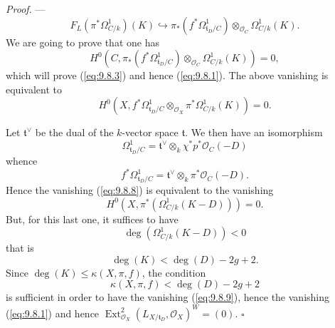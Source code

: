 \documentclass[12pt,a4paper,oneside,english,leqno]{smfart}
\numberwithin{equation}{subsection}
\numberwithin{theo}{subsection}
\theoremstyle{plain}
\theoremstyle{definition}
\theoremstyle{remark}
\newenvironment{preuve}[1][]{\medskip\noindent\textit{Proof.} #1 ---\ }%
  {\hfill\ensuremath{\square}\medskip}
\DeclareMathOperator{\Ext}{Ext}
\newcommand{\oc}{\mathcal{O}}
\newcommand{\tgo}{\mathfrak{t}}
\renewcommand{\leq}{\leqslant}
\begin{document}
\begin{preuve}
\begin{equation}\label{eq:9.8.6}
F_L(\pi^*\Omega^1_{C/k})(K)\hookrightarrow\pi_*(f^*\Omega^1_{\tgo_D/C})\otimes_{\oc_C}\Omega^1_{C/k}(K).
\end{equation}
We are going to prove that one has
\begin{equation}\label{eq:9.8.7}
H^0(C,\pi_*(f^*\Omega^1_{\tgo_D/C})\otimes_{\oc_C}\Omega^1_{C/k}(K))=0,
\end{equation}
which will prove (\ref{eq:9.8.3}) and hence (\ref{eq:9.8.1}). The above vanishing is equivalent to
\begin{equation}\label{eq:9.8.8}
H^0(X,f^*\Omega^1_{\tgo_D/C}\otimes_{\oc_X}\pi^*\Omega^1_{C/k}(K))=0.
\end{equation}

Let $\tgo^\vee$ be the dual of the $k$-vector space $\tgo$. We then have an isomorphism
\[
\Omega^1_{\tgo_D/C}=\tgo^\vee\otimes_k\chi^*p^*\oc_C(-D)
\]
whence
\[
f^*\Omega^1_{\tgo_D/C}=\tgo^\vee\otimes_k\pi^*\oc_C(-D).
\]
Hence the vanishing (\ref{eq:9.8.8}) is equivalent to the vanishing
\begin{equation}\label{eq:9.8.9}
H^0(X,\pi^*(\Omega^1_{C/k}(K-D)))=0.
\end{equation}
But, for this last one, it suffices to have
\[
\deg(\Omega^1_{C/k}(K-D))<0
\]
that is
\[
\deg(K)<\deg(D)-2g+2.
\]
Since $\deg(K)\leq\kappa(X,\pi,f)$, the condition
\[
\kappa(X,\pi,f)<\deg(D)-2g+2
\]
is sufficient in order to have the vanishing (\ref{eq:9.8.9}), hence the vanishing (\ref{eq:9.8.1}) and hence $\Ext^2_{\oc_X}(L_{X/\tgo_D},\oc_X)^W=(0)$.
\end{preuve}
\end{document}
